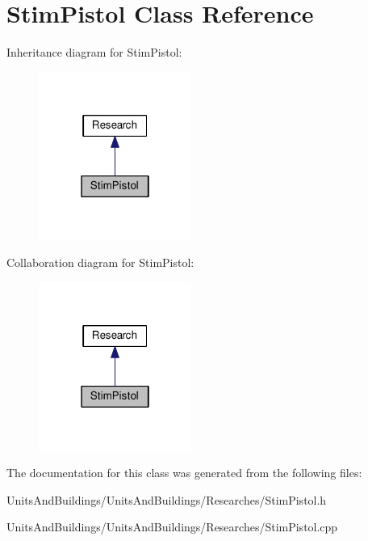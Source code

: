 \hypertarget{class_stim_pistol}{}\section{Stim\+Pistol Class Reference}
\label{class_stim_pistol}


Inheritance diagram for Stim\+Pistol\+:
\nopagebreak
\begin{figure}[H]
\begin{center}
\leavevmode
\includegraphics[width=142pt]{class_stim_pistol__inherit__graph}
\end{center}
\end{figure}


Collaboration diagram for Stim\+Pistol\+:
\nopagebreak
\begin{figure}[H]
\begin{center}
\leavevmode
\includegraphics[width=142pt]{class_stim_pistol__coll__graph}
\end{center}
\end{figure}


The documentation for this class was generated from the following files\+:\begin{DoxyCompactItemize}
\item 
Units\+And\+Buildings/\+Units\+And\+Buildings/\+Researches/Stim\+Pistol.\+h\item 
Units\+And\+Buildings/\+Units\+And\+Buildings/\+Researches/Stim\+Pistol.\+cpp\end{DoxyCompactItemize}
